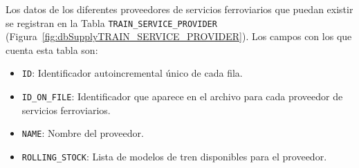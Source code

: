 \begin{table}[H]
\centering
\small
\setlength\tabcolsep{3pt}
\caption{Primeras cinco filas de la salida de la sentencia SQL del Listado~\ref{src:extraerInfoDeEStaciones}}
\label{tab:extraerInfoDeEStaciones}
\end{table}

Los datos de los diferentes proveedores de servicios ferroviarios que puedan existir se registran en la Tabla \texttt{TRAIN\_SERVICE\_PROVIDER} (Figura~\ref{fig:dbSupplyTRAIN_SERVICE_PROVIDER}). Los campos con los que cuenta esta tabla son: 
\begin{itemize}
    \item \texttt{ID}: Identificador autoincremental único de cada fila.
    \item \texttt{ID\_ON\_FILE}: Identificador que aparece en el archivo para cada proveedor de servicios ferroviarios.
    \item \texttt{NAME}: Nombre del proveedor.
    \item \texttt{ROLLING\_STOCK}: Lista de modelos de tren disponibles para el proveedor.
\end{itemize}


